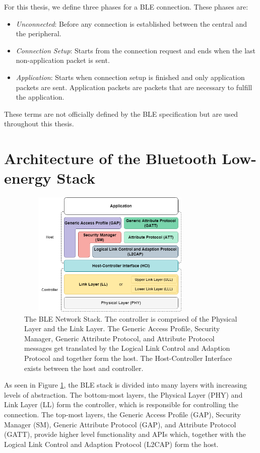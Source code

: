For this thesis, we define three phases for a BLE connection. These phases are:
\begin{itemize}
    \item \textit{Unconnected}: Before any connection is established between the central and the peripheral.
    \item \textit{Connection Setup}: Starts from the connection request and ends when the last non-application packet is sent. 
    \item \textit{Application}: Starts when connection setup is finished and only application packets are sent. Application packets are packets that are necessary to fulfill the application. 
\end{itemize}
These terms are not officially defined by the BLE specification but are used throughout this thesis. 

\section{Architecture of the Bluetooth Low-energy Stack}
\begin{figure}[]
    \centering
    \includegraphics[width=0.8\textwidth,height=6cm,keepaspectratio=true]{images/ble_stack/ble_stack.drawio.png}
    \caption{
        The BLE Network Stack. The controller is comprised of the Physical Layer and the Link Layer. The Generic Access Profile, Security Manager, Generic Attribute Protocol, and Attribute Protocol messages get translated by the Logical Link Control and Adaption Protocol and together form the host. The Host-Controller Interface exists between the host and controller.
    }
    \label{fig:ble_stack}
\end{figure}

As seen in Figure \ref{fig:ble_stack}, the BLE stack is divided into many layers with increasing levels of abstraction. The bottom-most layers, the Physical Layer (PHY) and Link Layer (LL) form the controller, which is responsible for controlling the connection. The top-most layers, the Generic Access Profile (GAP), Security Manager (SM), Generic Attribute Protocol (GAP), and Attribute Protocol (GATT), provide higher level functionality and APIs which, together with the Logical Link Control and Adaption Protocol (L2CAP) form the host.

